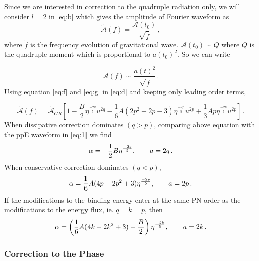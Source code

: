 \documentclass[11pt]{article}
\begin{document}
Since we are interested in correction to the quadruple radiation only, we will consider $l=2$ in \eqref{eq:b} which gives the amplitude of Fourier waveform as
\begin{equation}\label{eq:c}
\tilde{\mathcal{A}}(f)=\frac{\mathcal{A}(t_0)}{\sqrt{\dot{f}}}\,,
\end{equation}
where $\dot{f}$ is the frequency evolution of gravitational wave. $\mathcal{A}(t_0)\sim\ddot{Q}$ where $Q$ is the quadruple moment which is proportional to ${a(t_0)}^2$. So we can write

\begin{equation}\label{eq:d}
\mathcal{A}(f)\sim \frac{a(t)^2}{\sqrt{\dot{f}}}\,.
\end{equation}
Using equation \eqref{eq:f} and \eqref{eq:g} in \eqref{eq:d} and keeping only leading order terms,

\begin{equation}
\tilde{\mathcal{A}}(f)=\tilde{\mathcal{A}}_{GR} \left[1-\frac{B}{2}\eta^{\frac{-2q}{5}}u^{2q}-\frac{1}{6}A(2p^2-2p-3)\eta^{\frac{-2p}{5}}u^{2p}+\frac{1}{3}Ap\eta^{\frac{-2p}{5}}u^{2p}\right]\,.
\end{equation}
When dissipative correction dominates $(q>p)$, comparing above equation with the ppE waveform in \eqref{eq:1} we find
\begin{equation}
\alpha=-\frac{1}{2}B\eta^{\frac{-2q}{5}},\hspace*{20pt}a=2q\,.
\end{equation}
When conservative correction dominates $(q<p)$,
\begin{equation}
\alpha=\frac{1}{6}A(4p-2p^2+3)\eta^{\frac{-2p}{5}},\hspace*{20pt}a=2p\,.
\end{equation}
If the modifications to the binding energy enter at the same PN order as the modifications to the energy flux, ie. $q=k=p$, then
\begin{equation}\label{eq:2a}
\alpha=\left(\frac{1}{6}A(4k-2k^2+3)-\frac{B}{2}\right)\eta^{\frac{-2k}{5}},\hspace*{20pt}a=2k\,.
\end{equation}
 \subsubsection*{Correction to the Phase}
 
\end{document}
